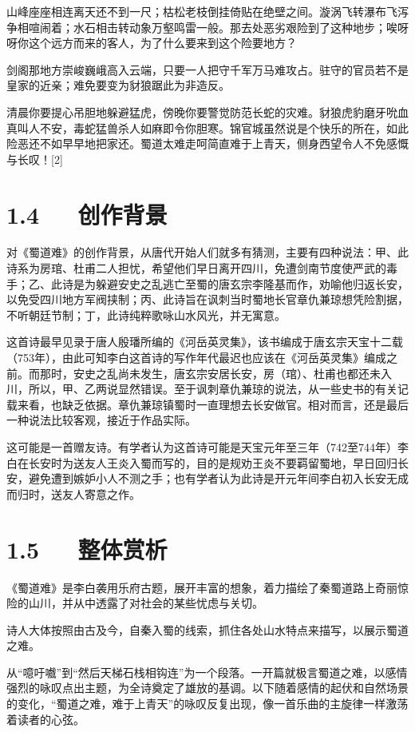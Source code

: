 \documentclass[letterpaper,12pt,english]{sphinxmanual}
\begin{document}
山峰座座相连离天还不到一尺；枯松老枝倒挂倚贴在绝壁之间。漩涡飞转瀑布飞泻争相喧闹着；水石相击转动象万壑鸣雷一般。那去处恶劣艰险到了这种地步；唉呀呀你这个远方而来的客人，为了什么要来到这个险要地方？

剑阁那地方崇峻巍峨高入云端，只要一人把守千军万马难攻占。驻守的官员若不是皇家的近亲；难免要变为豺狼踞此为非造反。

清晨你要提心吊胆地躲避猛虎，傍晚你要警觉防范长蛇的灾难。豺狼虎豹磨牙吮血真叫人不安，毒蛇猛兽杀人如麻即令你胆寒。锦官城虽然说是个快乐的所在，如此险恶还不如早早地把家还。蜀道太难走呵简直难于上青天，侧身西望令人不免感慨与长叹！{[}2{]}


\section{1.4   创作背景}
\label{\detokenize{p01_u6563_u6587/_u674e_u767d-_u8700_u9053_u96be:id6}}
对《蜀道难》的创作背景，从唐代开始人们就多有猜测，主要有四种说法：甲、此诗系为房琯、杜甫二人担忧，希望他们早日离开四川，免遭剑南节度使严武的毒手；乙、此诗是为躲避安史之乱逃亡至蜀的唐玄宗李隆基而作，劝喻他归返长安，以免受四川地方军阀挟制；丙、此诗旨在讽刺当时蜀地长官章仇兼琼想凭险割据，不听朝廷节制；丁，此诗纯粹歌咏山水风光，并无寓意。

这首诗最早见录于唐人殷璠所编的《河岳英灵集》，该书编成于唐玄宗天宝十二载（753年），由此可知李白这首诗的写作年代最迟也应该在《河岳英灵集》编成之前。而那时，安史之乱尚未发生，唐玄宗安居长安，房（琯）、杜甫也都还未入川，所以，甲、乙两说显然错误。至于讽刺章仇兼琼的说法，从一些史书的有关记载来看，也缺乏依据。章仇兼琼镇蜀时一直理想去长安做官。相对而言，还是最后一种说法比较客观，接近于作品实际。

这可能是一首赠友诗。有学者认为这首诗可能是天宝元年至三年（742至744年）李白在长安时为送友人王炎入蜀而写的，目的是规劝王炎不要羁留蜀地，早日回归长安，避免遭到嫉妒小人不测之手；也有学者认为此诗是开元年间李白初入长安无成而归时，送友人寄意之作。


\section{1.5   整体赏析}
\label{\detokenize{p01_u6563_u6587/_u674e_u767d-_u8700_u9053_u96be:id7}}
《蜀道难》是李白袭用乐府古题，展开丰富的想象，着力描绘了秦蜀道路上奇丽惊险的山川，并从中透露了对社会的某些忧虑与关切。

诗人大体按照由古及今，自秦入蜀的线索，抓住各处山水特点来描写，以展示蜀道之难。

从“噫吁嚱”到“然后天梯石栈相钩连”为一个段落。一开篇就极言蜀道之难，以感情强烈的咏叹点出主题，为全诗奠定了雄放的基调。以下随着感情的起伏和自然场景的变化，“蜀道之难，难于上青天”的咏叹反复出现，像一首乐曲的主旋律一样激荡着读者的心弦。
\end{document}
